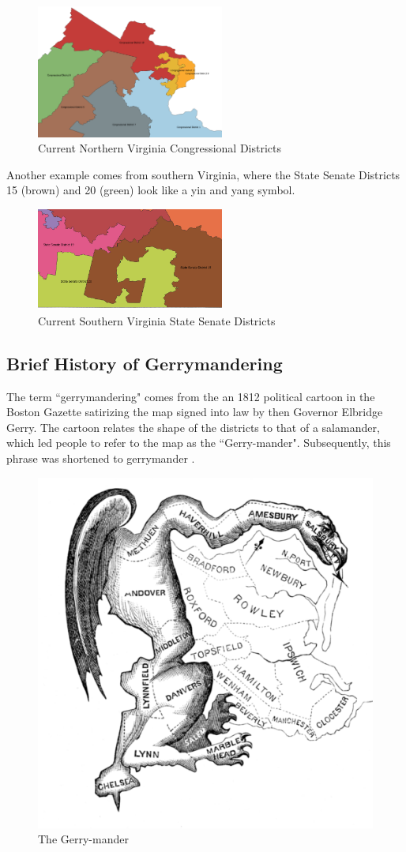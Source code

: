 \documentclass[11pt]{article}
\begin{document}
\begin{figure}[H]
	\centering
	\includegraphics[width=0.55\textwidth]{GerrymanderingNOVA}
	\caption{Current Northern Virginia Congressional Districts}
	\label{fig:Gerrymandering_NOVA}
\end{figure}

Another example comes from southern Virginia, where the State Senate Districts 15 (brown) and 20 (green) look like a yin and yang symbol.

\begin{figure}[H]
	\centering
	\includegraphics[width=0.55\textwidth]{Senate_15_20}
	\caption{Current Southern Virginia State Senate Districts}
	\label{fig:Gerrymandering_SOVA}
\end{figure}

\subsection{Brief History of Gerrymandering}

The term ``gerrymandering" comes from the an 1812 political cartoon in the Boston Gazette satirizing the map signed into law by then Governor Elbridge Gerry. The cartoon relates the shape of the districts to that of a salamander, which led people to refer to the map as the ``Gerry-mander". Subsequently, this phrase was shortened to gerrymander \cite{GerrymanderingWiki}.

\begin{figure}[H]
	\centering
	\includegraphics[width=.5\textwidth]{TheGerryMander}
	\caption{The Gerry-mander}
	\label{fig:The_Gerry_Mander}
\end{figure}
\end{document}
